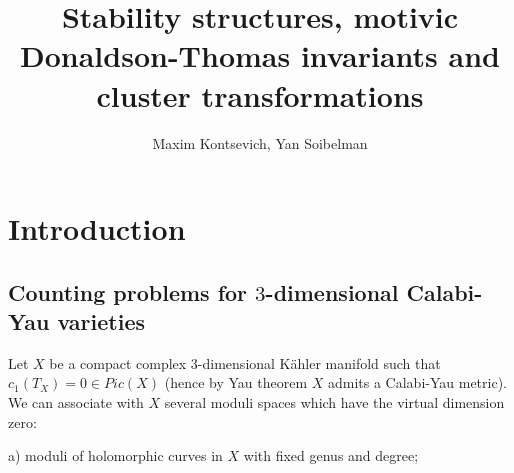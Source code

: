 \documentclass[12pt]{article}
\title{Stability structures, motivic Donaldson-Thomas invariants and cluster transformations}
\author {Maxim Kontsevich, Yan Soibelman}
\begin{document}
\maketitle

\newcommand{\op}[1]{\operatorname{#1}}


\newcommand{\CC}{{\mathcal C}}

\renewcommand{\O}{{\mathcal O}}

\newcommand{\E}{{\mathcal E}}
\newcommand{\F}{{\mathcal F}}

\newcommand{\g}{{\mathfrak g}}
\newcommand{\h}{{\mathfrak h}}

\renewcommand{\k}{{\bf k}}
\newcommand{\kk}{{\overline{\bf k}}}





\newtheorem{defn}{Definition}
\newtheorem{thm}{Theorem}
\newtheorem{lmm}{Lemma}
\newtheorem{rmk}{Remark}
\newtheorem{prp}{Proposition}
\newtheorem{conj}{Conjecture}
\newtheorem{exa}{Example}
\newtheorem{cor}{Corollary}
\newtheorem{que}{Question}
\newtheorem{ack}{Acknowledgments}
\newcommand{\C}{{\bf C}}
\newcommand{\K}{{\bf k}}
\newcommand{\R}{{\bf R}}
\newcommand{\N}{{\bf N}}
\newcommand{\Z}{{\bf Z}}
\newcommand{\Q}{{\bf Q}}
\newcommand{\G}{\Gamma}
\newcommand{\A}{A_{\infty}}


\newcommand{\epi}{\twoheadrightarrow}
\newcommand{\mono}{\hookrightarrow}
\newcommand\ra{\rightarrow}
\newcommand\uhom{{\underline{\op{Hom}}}}
\renewcommand\O{{\cal O}}
\newcommand{\epp}{\varepsilon}





\tableofcontents


\section{Introduction}

\subsection{Counting problems for $3$-dimensional Calabi-Yau varieties}

Let $X$ be a compact complex $3$-dimensional K\"ahler manifold such that $c_1(T_X)=0\in Pic(X)$
(hence by Yau theorem $X$ admits a Calabi-Yau metric).
We can associate with $X$ several moduli spaces which have the virtual dimension zero:

a) moduli of holomorphic curves in $X$ with  fixed genus and degree;
\end{document}
